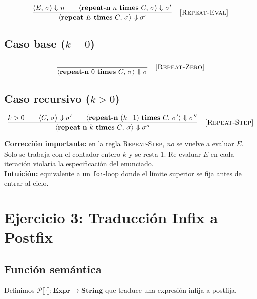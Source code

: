 \documentclass[11pt]{article}
\begin{document}
\[
  \frac{
    \langle E,\, \sigma \rangle \Downarrow n
    \qquad
    \langle \mathbf{repeat\text{-}n}\ n\ \mathbf{times}\ C,\,
            \sigma \rangle \Downarrow \sigma'
  }{
    \langle \mathbf{repeat}\ E\ \mathbf{times}\ C,\,
            \sigma \rangle \Downarrow \sigma'
  }
  \quad \textsc{[Repeat-Eval]}
\]

\subsection*{Caso base ($k = 0$)}

\[
  \frac{\phantom{X}}{
    \langle \mathbf{repeat\text{-}n}\ 0\ \mathbf{times}\ C,\,
            \sigma \rangle \Downarrow \sigma
  }
  \quad \textsc{[Repeat-Zero]}
\]

\subsection*{Caso recursivo ($k > 0$)}


\[
  \frac{
    k > 0
    \qquad
    \langle C,\, \sigma \rangle \Downarrow \sigma'
    \qquad
    \langle \mathbf{repeat\text{-}n}\ (k{-}1)\ \mathbf{times}\ C,\,
            \sigma' \rangle \Downarrow \sigma''
  }{
    \langle \mathbf{repeat\text{-}n}\ k\ \mathbf{times}\ C,\,
            \sigma \rangle \Downarrow \sigma''
  }
  \quad \textsc{[Repeat-Step]}
\]

\begin{tcolorbox}
  \textbf{Corrección importante:} en la regla \textsc{Repeat-Step},
  \emph{no} se vuelve a evaluar $E$.
  Solo se trabaja con el contador entero $k$ y se resta $1$.
  Re-evaluar $E$ en cada iteración violaría la especificación del enunciado.\\[4pt]
  \textbf{Intuición:} equivalente a un \texttt{for}-loop donde el límite
  superior se fija antes de entrar al ciclo.
\end{tcolorbox}


\section{Ejercicio 3: Traducción Infix a Postfix}


\subsection*{Función semántica}

Definimos $\mathcal{P}\llbracket \cdot \rrbracket : \mathbf{Expr}
\to \mathbf{String}$ que traduce una expresión infija a postfija.
\end{document}

